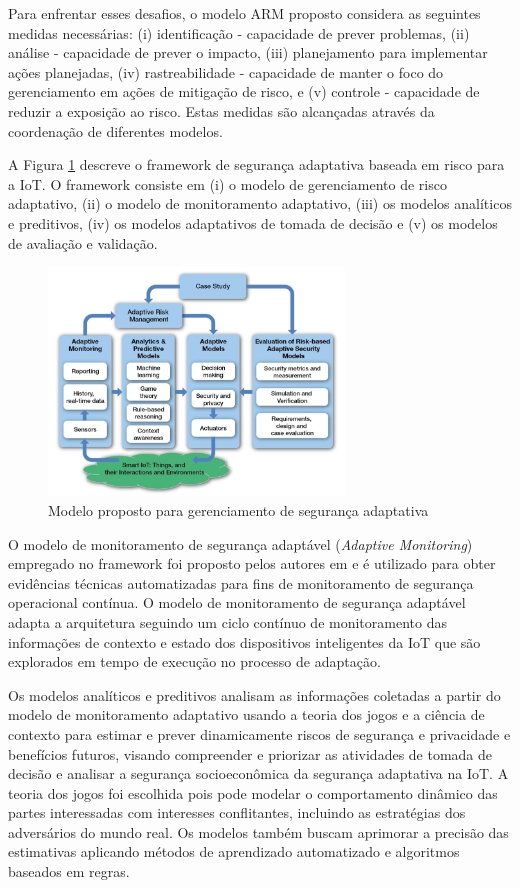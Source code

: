 \documentclass[tid,table]{texufpel} %
\begin{document}
Para enfrentar esses desafios, o modelo ARM proposto considera as seguintes medidas necessárias: (i) identificação - capacidade de prever problemas, (ii) análise - capacidade de prever o impacto, (iii) planejamento para implementar ações planejadas, (iv) rastreabilidade - capacidade de manter o foco do gerenciamento em ações de mitigação de risco, e (v) controle - capacidade de reduzir a exposição ao risco. Estas medidas são alcançadas através da coordenação de diferentes modelos.

A Figura \ref{adaptive-security-management-model} descreve o framework de segurança adaptativa baseada em risco para a IoT. O framework consiste em (i) o modelo de gerenciamento de risco adaptativo, (ii) o modelo de monitoramento adaptativo, (iii) os modelos analíticos e preditivos, (iv) os modelos adaptativos de tomada de decisão e (v) os modelos de avaliação e validação.

\begin{figure}[ht]
\centering
\includegraphics[width=0.7\textwidth]{imagens/adaptive-security-management-model.png}
\caption{Modelo proposto para gerenciamento de segurança adaptativa}
\label{adaptive-security-management-model}
\end{figure}

O modelo de monitoramento de segurança adaptável (\textit{Adaptive Monitoring}) empregado no framework foi proposto pelos autores em \cite{abie10} e é utilizado para obter evidências técnicas automatizadas para fins de monitoramento de segurança operacional contínua. O modelo de monitoramento de segurança adaptável adapta a arquitetura seguindo um ciclo contínuo de monitoramento das informações de contexto e estado dos dispositivos inteligentes da IoT que são explorados em tempo de execução no processo de adaptação.

Os modelos analíticos e preditivos analisam as informações coletadas  a partir do modelo de monitoramento adaptativo usando a teoria dos jogos e a ciência de contexto para estimar e prever dinamicamente riscos de segurança e privacidade e benefícios futuros, visando compreender e priorizar as atividades de tomada de decisão e analisar a segurança socioeconômica da segurança adaptativa na IoT. A teoria dos jogos foi escolhida pois pode modelar o comportamento dinâmico das partes interessadas com interesses conflitantes, incluindo as estratégias dos adversários do mundo real. Os modelos também buscam aprimorar a precisão das estimativas aplicando métodos de aprendizado automatizado e algoritmos baseados em regras.
\end{document}
